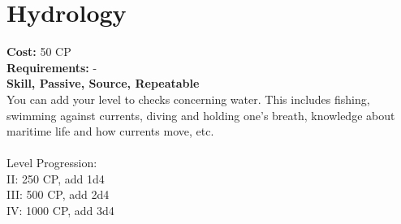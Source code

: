 \section{Hydrology}
\textbf{Cost:} 50 CP\\
\textbf{Requirements:} -\\
\textbf{Skill, Passive, Source, Repeatable}\\
You can add your level to checks concerning water. This includes fishing, swimming against currents, diving and holding one's breath, knowledge about maritime life and how currents move, etc.\\
\\
Level Progression:\\
II: 250 CP, add 1d4\\
III: 500 CP, add 2d4\\
IV: 1000 CP, add 3d4\\